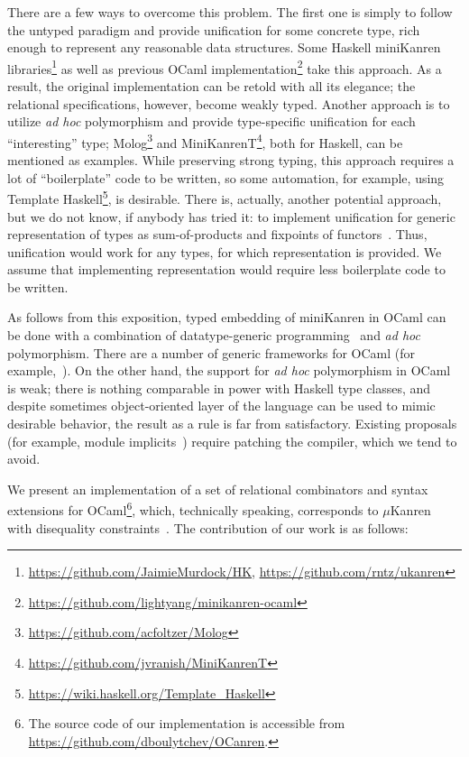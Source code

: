 There are a few ways to overcome this problem. The first one is simply to follow the untyped paradigm and
provide unification for some concrete type, rich enough to represent any reasonable data structures.
Some Haskell miniKanren libraries\footnote{\url{https://github.com/JaimieMurdock/HK}, \url{https://github.com/rntz/ukanren}}
as well as previous OCaml implementation\footnote{\url{https://github.com/lightyang/minikanren-ocaml}} take this approach. 
As a result, the original implementation can be retold with all its elegance; the relational specifications, however,
become weakly typed. Another approach is to utilize \emph{ad hoc} polymorphism and provide type-specific
unification for each ``interesting'' type; Molog\footnote{\url{https://github.com/acfoltzer/Molog}} and 
MiniKanrenT\footnote{\url{https://github.com/jvranish/MiniKanrenT}}, both for Haskell, can be mentioned as examples.
While preserving strong typing, this approach requires a lot of ``boilerplate'' code to be written, so some
automation, for example, using Template Haskell\footnote{\url{https://wiki.haskell.org/Template_Haskell}},
is desirable. There is, actually, another potential approach, but we do not know, if anybody has tried
it: to implement unification for generic representation of types as sum-of-products and fixpoints of 
functors~\cite{InstantGenerics, ALaCarte}. Thus, unification would work for any types, for which representation
is provided. We assume that implementing representation would require less boilerplate code to be written.

As follows from this exposition, typed embedding of miniKanren in OCaml can be done with
a combination of datatype-generic programming~\cite{DGP} and \emph{ad hoc} polymorphism. There are a 
number of generic frameworks for OCaml (for example,~\cite{Deriving}). On the other hand, the support
for \emph{ad hoc} polymorphism in OCaml is weak; there is nothing comparable in power with Haskell 
type classes, and despite sometimes object-oriented layer of the language can be used to mimic
desirable behavior, the result as a rule is far from satisfactory. Existing proposals (for example, 
module implicits~\cite{Implicits}) require patching the compiler, which we tend to avoid.

We present an implementation of a set of relational combinators and syntax extensions for 
OCaml\footnote{The source code of our implementation is accessible from \url{https://github.com/dboulytchev/OCanren}.}, 
which, technically speaking, corresponds to $\mu$Kanren~\cite{MicroKanren} with disequality 
constraints~\cite{CKanren}. The contribution of our work is as follows:

